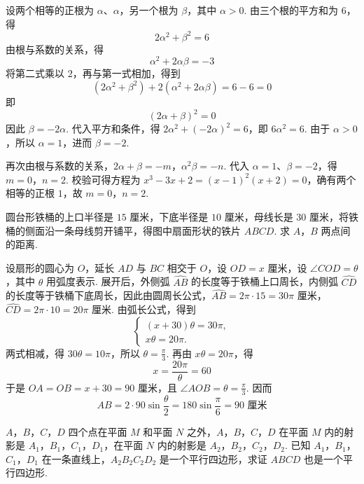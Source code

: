 \documentclass[UTF8,a4paper,oneside,11pt]{ctexbook}
\begin{document}
\begin{solution}
设两个相等的正根为 \(\alpha\)、\(\alpha\)，另一个根为 \(\beta\)，其中 \(\alpha>0\). 由三个根的平方和为 \(6\)，得
\[
2\alpha^2+\beta^2=6
\]
由根与系数的关系，得
\[
\alpha^2+2\alpha\beta=-3
\]
将第二式乘以 \(2\)，再与第一式相加，得到
\[
\left( 2\alpha^2+\beta^2 \right)+2\left( \alpha^2+2\alpha\beta \right)=6-6=0
\]
即
\[
\left( 2\alpha+\beta \right)^2=0
\]
因此 \(\beta=-2\alpha\). 代入平方和条件，得 \(2\alpha^2+\left( -2\alpha \right)^2=6\)，即 \(6\alpha^2=6\).
由于 \(\alpha>0\)，所以 \(\alpha=1\)，进而 \(\beta=-2\).

再次由根与系数的关系，\(2\alpha+\beta=-m\)，\(\alpha^2\beta=-n\).
代入 \(\alpha=1\)、\(\beta=-2\)，得
\(m=0\)，\(n=2\).
校验可得方程为 \(x^3-3x+2=\left( x-1 \right)^2\left( x+2 \right)=0\)，确有两个相等的正根 \(1\)，故 \(m=0\)，\(n=2\).
\end{solution}

\begin{problem}
圆台形铁桶的上口半径是 \(15\text{ 厘米}\)，下底半径是 \(10\text{ 厘米}\)，母线长是 \(30\text{ 厘米}\)，将铁桶的侧面沿一条母线剪开铺平，得图中扇面形状的铁片 \(ABCD\). 求 \(A\)，\(B\) 两点间的距离.

\end{problem}

\begin{solution}
设扇形的圆心为 \(O\)，延长 \(AD\) 与 \(BC\) 相交于 \(O\)，设 \(OD=x\text{ 厘米}\)，设 \(\angle COD=\theta\)，其中 \(\theta\) 用弧度表示. 展开后，外侧弧 \(\widehat{AB}\) 的长度等于铁桶上口周长，内侧弧 \(\widehat{CD}\) 的长度等于铁桶下底周长，因此由圆周长公式，\(\widehat{AB}=2\pi\cdot15=30\pi\text{ 厘米}\)，\(\widehat{CD}=2\pi\cdot10=20\pi\text{ 厘米}\).
由弧长公式，得到
\[
\begin{cases}
\left( x+30 \right)\theta=30\pi,\\
x\theta=20\pi.
\end{cases}
\]
两式相减，得 \(30\theta=10\pi\)，所以 \(\theta=\frac{\pi}{3}\). 再由 \(x\theta=20\pi\)，得
\[
x=\frac{20\pi}{\theta}=60
\]
于是 \(OA=OB=x+30=90\text{ 厘米}\)，且 \(\angle AOB=\theta=\frac{\pi}{3}\). 因而
\[
AB=2\cdot90\sin\frac{\theta}{2}=180\sin\frac{\pi}{6}=90\text{ 厘米}
\]
\end{solution}

\begin{problem}
\(A\)，\(B\)，\(C\)，\(D\) 四个点在平面 \(M\) 和平面 \(N\) 之外，\(A\)，\(B\)，\(C\)，\(D\) 在平面 \(M\) 内的射影是 \(A_1\)，\(B_1\)，\(C_1\)，\(D_1\)，在平面 \(N\) 内的射影是 \(A_2\)，\(B_2\)，\(C_2\)，\(D_2\). 已知 \(A_1\)，\(B_1\)，\(C_1\)，\(D_1\) 在一条直线上，\(A_2B_2C_2D_2\) 是一个平行四边形，求证 \(ABCD\) 也是一个平行四边形.
\end{problem}
\end{document}
